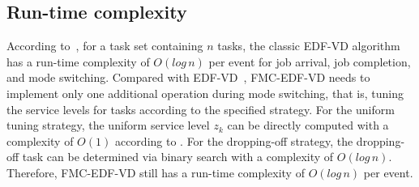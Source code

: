 \documentclass[10pt,journal,compsoc]{IEEEtran}
\begin{document}
%
%

\subsection{Run-time complexity}
According to~\cite{Baruah2012}, for a task set containing $n$ tasks, the classic EDF-VD algorithm has a run-time complexity of $O(log \,n)$ per event for job arrival, job completion, and mode switching. Compared with EDF-VD~\cite{Baruah2012}, FMC-EDF-VD needs to implement only one additional operation during mode switching, that is, tuning the service levels for \lo tasks according to the specified strategy. For the uniform tuning strategy, the uniform service level $z_k$ can be directly computed with a complexity of $O(1)$ according to . For the dropping-off strategy, the dropping-off task can be determined via binary search with a complexity of $O(log\,n)$. Therefore, FMC-EDF-VD still has a run-time complexity of $O(log\,n)$ per event. 
\end{document}
